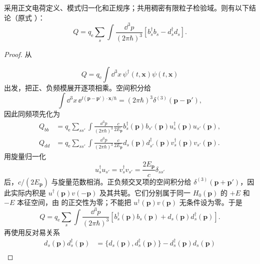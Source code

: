 \begin{proposition}
采用正文电荷定义、模式归一化和正规序；共用稠密有限粒子检验域。则有以下结论（原式 ）：
\begin{equation*}
\boxed{
Q=q_{\mathrm e}\sum_s\int\frac{\dd^3 p}{(2\pi\hbar)^3}
\left[b_s^\dagger b_s-d_s^\dagger d_s\right].}
\end{equation*}
\end{proposition}
\begin{proof}
从

\begin{equation*}
Q=q_{\mathrm e}\int\dd^3 x\,\psi^\dagger(t,\mathbf x)\psi(t,\mathbf x)
\end{equation*}
出发，把正、负频模展开逐项相乘。空间积分给
\begin{equation*}
\int\dd^3 x\,\ee^{\ii(\mathbf p-\mathbf p')\cdot\mathbf x/\hbar}
=(2\pi\hbar)^3\delta^{(3)}(\mathbf p-\mathbf p'),
\end{equation*}
因此同频项先化为
\begin{align*}
Q_{bb}
&=q_{\mathrm e}\sum_{ss'}\int\frac{\dd^3 p}{(2\pi\hbar)^3}
\frac{c}{2E_{\mathbf p}}
 b_s^\dagger(\mathbf p)b_{s'}(\mathbf p)
 u_s^\dagger(\mathbf p)u_{s'}(\mathbf p),\\
Q_{dd}
&=q_{\mathrm e}\sum_{ss'}\int\frac{\dd^3 p}{(2\pi\hbar)^3}
\frac{c}{2E_{\mathbf p}}
 d_s(\mathbf p)d_{s'}^\dagger(\mathbf p)
 v_s^\dagger(\mathbf p)v_{s'}(\mathbf p).
\end{align*}
用旋量归一化
\begin{equation*}
u_s^\dagger u_{s'}=v_s^\dagger v_{s'}=\frac{2E_{\mathbf p}}{c}\delta_{ss'}
\end{equation*}
后，$c/(2E_{\mathbf p})$ 与旋量范数相消。正负频交叉项的空间积分给 $\delta^{(3)}(\mathbf p+\mathbf p')$，因此实际内积是 $u^\dagger(\mathbf p)v(-\mathbf p)$ 及其共轭。它们分别属于同一 $H_0(\mathbf p)$ 的 $+E$ 和 $-E$ 本征空间，由 的正交性为零；不能把 $u^\dagger(\mathbf p)v(\mathbf p)$ 无条件设为零。于是
\begin{equation*}
Q=q_{\mathrm e}\sum_s\int\frac{\dd^3 p}{(2\pi\hbar)^3}
\left[b_s^\dagger(\mathbf p)b_s(\mathbf p)+d_s(\mathbf p)d_s^\dagger(\mathbf p)\right].
\end{equation*}
再使用反对易关系
\begin{align*}
d_s(\mathbf p)d_s^\dagger(\mathbf p)
&=\{d_s(\mathbf p),d_s^\dagger(\mathbf p)\}-d_s^\dagger(\mathbf p)d_s(\mathbf p)\\

\end{align*}
\end{proof}
